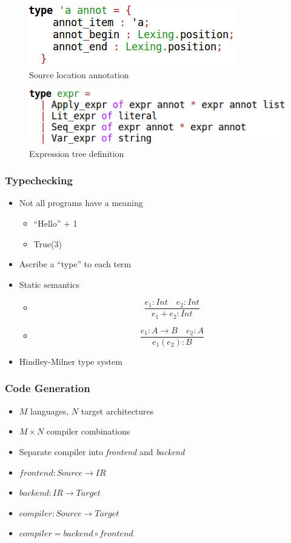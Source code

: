 \documentclass{beamer}
\begin{document}
\begin{frame}
  \begin{figure}
    \includegraphics[scale=0.5]{ast-annot.png}
    \caption{Source location annotation}
  \end{figure}
  \begin{figure}
    \includegraphics[scale=0.5]{ast-expr.png}
    \caption{Expression tree definition}
  \end{figure}
\end{frame}

\begin{frame}
  \frametitle{Typechecking}
  \begin{itemize}
    \pause
  \item Not all programs have a meaning
    \begin{itemize}
      \pause
    \item ``Hello'' + 1
      \pause
    \item True(3)
    \end{itemize}
  \item Ascribe a ``type'' to each term
    \pause
  \item Static semantics
    \begin{itemize}
      \pause
    \item
      $$
      \frac{e_1 : Int \quad e_2 : Int}{e_1 + e_2 : Int}
      $$
      \pause
    \item
      $$
      \frac{e_1 : A \to B \quad e_2 : A}{e_1 (e_2) : B}
      $$
    \end{itemize}
  \item Hindley-Milner type system
  \end{itemize}
\end{frame}

\begin{frame}
  \frametitle{Code Generation}
  \begin{itemize}
    \pause
  \item $M$ languages, $N$ target architectures
    \pause
  \item $M \times N$ compiler combinations
    \pause
  \item Separate compiler into \textit{frontend} and \textit{backend}
    \pause
  \item $frontend : Source \to IR$
    \pause
  \item $backend : IR \to Target$
    \pause
  \item $compiler : Source \to Target$
    \pause
  \item $compiler = backend \circ frontend$
  \end{itemize}
\end{frame}
\end{document}
